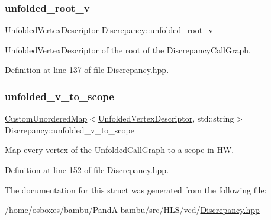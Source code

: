 \subsubsection{\texorpdfstring{unfolded\+\_\+root\+\_\+v}{unfolded\_root\_v}}
{\footnotesize\ttfamily \hyperlink{UnfoldedCallGraph_8hpp_a6c87395c9d950d587c8e4db39b93e3e2}{Unfolded\+Vertex\+Descriptor} Discrepancy\+::unfolded\+\_\+root\+\_\+v}



Unfolded\+Vertex\+Descriptor of the root of the Discrepancy\+Call\+Graph. 



Definition at line 137 of file Discrepancy.\+hpp.

\mbox{\label{structDiscrepancy_aa61fa1c5f2ec0207409fbf6147e5f6a2}} 
\subsubsection{\texorpdfstring{unfolded\+\_\+v\+\_\+to\+\_\+scope}{unfolded\_v\_to\_scope}}
{\footnotesize\ttfamily \hyperlink{custom__map_8hpp_ad1ed68f2ff093683ab1a33522b144adc}{Custom\+Unordered\+Map}$<$\hyperlink{UnfoldedCallGraph_8hpp_a6c87395c9d950d587c8e4db39b93e3e2}{Unfolded\+Vertex\+Descriptor}, std\+::string$>$ Discrepancy\+::unfolded\+\_\+v\+\_\+to\+\_\+scope}



Map every vertex of the \hyperlink{classUnfoldedCallGraph}{Unfolded\+Call\+Graph} to a scope in HW. 



Definition at line 152 of file Discrepancy.\+hpp.



The documentation for this struct was generated from the following file\+:\begin{DoxyCompactItemize}
\item 
/home/osboxes/bambu/\+Pand\+A-\/bambu/src/\+H\+L\+S/vcd/\hyperlink{Discrepancy_8hpp}{Discrepancy.\+hpp}\end{DoxyCompactItemize}
